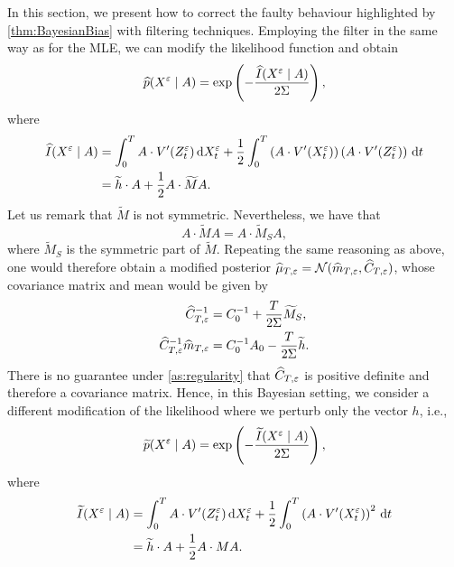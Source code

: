 \documentclass[review,onefignum,onetabnum]{siamonline190516}
\begin{document}
In this section, we present how to correct the faulty behaviour highlighted by \cref{thm:BayesianBias} with filtering techniques. Employing the filter in the same way as for the MLE, we can modify the likelihood function and obtain 
\begin{equation}
	\widehat p(X^\varepsilon \mid A) = \exp\left(-\frac{\widehat I(X^\varepsilon\mid A)}{2\Sigma} \right), 
\end{equation}
where 
\begin{equation}
\begin{aligned}
	\widehat I(X^\varepsilon \mid A) & = \int_0^T A \cdot V'(Z^\varepsilon_t) \,\mathrm{d} X^\varepsilon_t + \frac12 \int_0^T \left(A \cdot V'(X^\varepsilon_t)\right)\left(A \cdot V'(Z^\varepsilon_t)\right) \,\mathrm{d} t \\
	&= \widetilde h \cdot A + \frac12 A \cdot \widetilde M A.
\end{aligned}
\end{equation}
Let us remark that $\widetilde M$ is not symmetric. Nevertheless, we have that
\begin{equation}
	A \cdot \widetilde M A = A \cdot \widetilde M_S A,
\end{equation}
where $\widetilde M_S$ is the symmetric part of $\widetilde M$. Repeating the same reasoning as above, one would therefore obtain a modified posterior $\widehat \mu_{T, \varepsilon} = \mathcal N(\widehat m_{T, \varepsilon}, \widehat C_{T, \varepsilon})$, whose covariance matrix and mean would be given by
\begin{equation}
\begin{aligned}
	\widehat C_{T, \varepsilon}^{-1} &= C_0^{-1} + \frac{T}{2\Sigma} \widetilde M_S, \\
	\widehat C_{T,\varepsilon}^{-1}\widehat m_{T,\varepsilon} &= C_0^{-1}A_0 - \frac{T}{2\Sigma} \widetilde h. 
\end{aligned}	
\end{equation}
There is no guarantee under \cref{as:regularity} that $\widehat C_{T, \varepsilon}$ is positive definite and therefore a covariance matrix. Hence, in this Bayesian setting, we consider a different modification of the likelihood where we perturb only the vector $h$, i.e.,
\begin{equation}
	\widetilde p(X^\varepsilon \mid A) = \exp\left(-\frac{\widetilde I(X^\varepsilon\mid A)}{2\Sigma} \right), 
\end{equation}
where 
\begin{equation}
\begin{aligned}
	\widetilde I(X^\varepsilon \mid A) & = \int_0^T A \cdot V'(Z^\varepsilon_t) \,\mathrm{d} X^\varepsilon_t + \frac12 \int_0^T \left(A \cdot V'(X^\varepsilon_t)\right)^2 \,\mathrm{d} t \\
	&= \widetilde h \cdot A + \frac12 A \cdot M A.
\end{aligned}
\end{equation}
\end{document}
